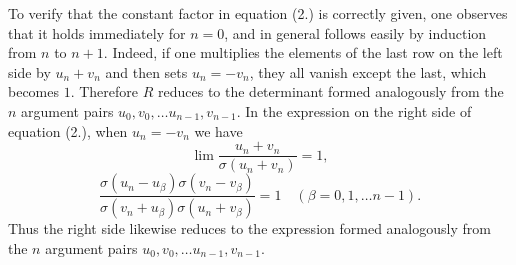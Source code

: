 \documentclass[12pt]{article}
\begin{document}
To verify that the constant factor in equation (2.) is correctly given, one observes that it holds immediately for $n=0$, and in general follows easily by induction from $n$ to $n+1$. Indeed, if one multiplies the elements of the last row on the left side by $u_n+v_n$ and then sets $u_n = -v_n$, they all vanish except the last, which becomes $1$. Therefore $R$ reduces to the determinant formed analogously from the $n$ argument pairs $u_0, v_0, \dots u_{n-1}, v_{n-1}$. In the expression on the right side of equation (2.), when $u_n = -v_n$ we have
\begin{equation*}
\lim \frac{u_n+v_n}{\sigma(u_n+v_n)} = 1,
\end{equation*}
\begin{equation*}
\frac{\sigma(u_n-u_\beta)\sigma(v_n-v_\beta)}{\sigma(v_n+u_\beta)\sigma(u_n+v_\beta)} = 1 \quad (\beta = 0, 1, \dots n-1).
\end{equation*}
Thus the right side likewise reduces to the expression formed analogously from the $n$ argument pairs $u_0, v_0, \dots u_{n-1}, v_{n-1}$.
\end{document}
